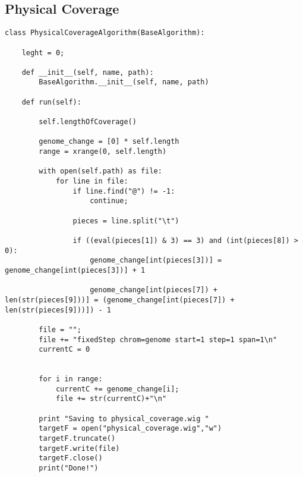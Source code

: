 \newpage
\subsection{Physical Coverage}
\tiny
\begin{verbatim}
class PhysicalCoverageAlgorithm(BaseAlgorithm):

    leght = 0;

    def __init__(self, name, path):
        BaseAlgorithm.__init__(self, name, path)

    def run(self):

        self.lengthOfCoverage()

        genome_change = [0] * self.length
        range = xrange(0, self.length)

        with open(self.path) as file:
            for line in file:
                if line.find("@") != -1:
                    continue;

                pieces = line.split("\t")

                if ((eval(pieces[1]) & 3) == 3) and (int(pieces[8]) > 0):
                    genome_change[int(pieces[3])] = genome_change[int(pieces[3])] + 1

                    genome_change[int(pieces[7]) + len(str(pieces[9]))] = (genome_change[int(pieces[7]) + len(str(pieces[9]))]) - 1

        file = "";
        file += "fixedStep chrom=genome start=1 step=1 span=1\n"
        currentC = 0


        for i in range:
            currentC += genome_change[i];
            file += str(currentC)+"\n"

        print "Saving to physical_coverage.wig "
        targetF = open("physical_coverage.wig","w")
        targetF.truncate()
        targetF.write(file)
        targetF.close()
        print("Done!")
\end{verbatim}


\newpage
